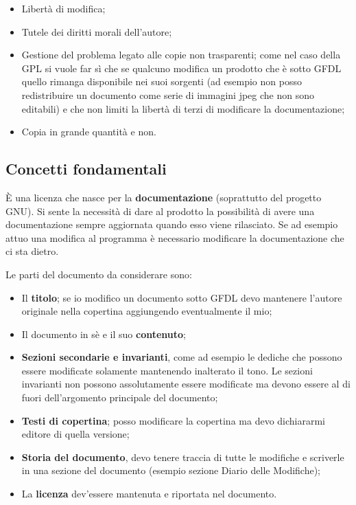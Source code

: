 \begin{itemize}

\item Libertà di modifica;
\item Tutele dei diritti morali dell'autore;
\item Gestione del problema legato alle copie non trasparenti; come nel caso della GPL si vuole far sì che se qualcuno modifica un prodotto che è sotto GFDL quello rimanga disponibile nei suoi sorgenti (ad esempio non posso redistribuire un documento come serie di immagini jpeg che non sono editabili) e che non limiti la libertà di terzi di modificare la documentazione;
\item Copia in grande quantità e non.

\end{itemize}

\subsection{Concetti fondamentali}

È una licenza che nasce per la \textbf{documentazione} (soprattutto del progetto GNU). Si sente la necessità di dare al prodotto la possibilità di avere una documentazione sempre aggiornata quando esso viene rilasciato. Se ad esempio attuo una modifica al programma è necessario modificare la documentazione che ci sta dietro. 

Le parti del documento da considerare sono:

\begin{itemize}

\item Il \textbf{titolo}; se io modifico un documento sotto GFDL devo mantenere l'autore originale nella copertina aggiungendo eventualmente il mio;
\item Il documento in sè e il suo \textbf{contenuto};
\item \textbf{Sezioni secondarie e invarianti}, come ad esempio le dediche che possono essere modificate solamente mantenendo inalterato il tono. Le sezioni invarianti non possono assolutamente essere modificate ma devono essere al di fuori dell'argomento principale del documento;
\item \textbf{Testi di copertina}; posso modificare la copertina ma devo dichiararmi editore di quella versione;
\item \textbf{Storia del documento}, devo tenere traccia di tutte le modifiche e scriverle in una sezione del documento (esempio sezione Diario delle Modifiche);
\item La \textbf{licenza} dev'essere mantenuta e riportata nel documento.

\end{itemize}

